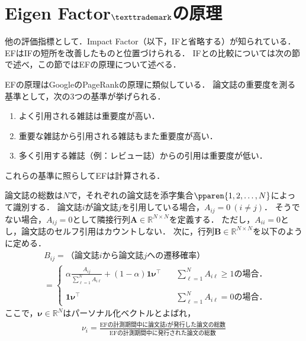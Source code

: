 
\section{Eigen Factor$\texttrademark$の原理}
他の評価指標として．Impact Factor（以下，IFと省略する）が知られている．
EFはIFの短所を改善したものと位置づけられる．
IFとの比較については次の節で述べ，この節ではEFの原理について述べる．
\par
EFの原理はGoogleのPageRankの原理に類似している．
論文誌の重要度を測る基準として，次の3つの基準が挙げられる．
\begin{enumerate}
    \item よく引用される雑誌は重要度が高い．
    \item 重要な雑誌から引用される雑誌もまた重要度が高い．
    \item 多く引用する雑誌（例：レビュー誌）からの引用は重要度が低い．
\end{enumerate}
これらの基準に照らしてEFは計算される．
\par
論文誌の総数は$N$で，それぞれの論文誌を添字集合$\pparen{1,2,\ldots,N}$によって識別する．
論文誌$i$が論文誌$j$を引用している場合，$A_{ij}=0~(i\neq j)$．
そうでない場合，$A_{ij}=0$として隣接行列$\bm{A} \in \mathbb{R}^{N \times N}$を定義する．
ただし，$A_{ii}=0$とし，論文誌のセルフ引用はカウントしない．
次に，行列$\bm{B} \in \mathbb{R}^{N \times N}$を以下のように定める．
\begin{align*}
     & B_{ij} = \text{（論文誌$i$から論文誌$j$への遷移確率）}                                                                                \\
     & =\begin{cases}
            \alpha \frac{A_{ij}}{\sum_{\ell=1}^N A_{i\ell}} + (1-\alpha) \bm{1}\bm{\nu}^{\top}
             & \quad \sum_{\ell=1}^N A_{i\ell} \geq 1\text{の場合．} \\
            \\
            \bm{1}\bm{\nu}^{\top}
             & \quad \sum_{\ell=1}^N A_{i\ell} =0\text{の場合．}
        \end{cases}
\end{align*}
ここで，$\bm{\nu} \in \mathbb{R}^N$はパーソナル化ベクトルとよばれ，
\begin{align*}
    \nu_i
    = \frac{\text{EFの計測期間中に論文誌$i$が発行した論文の総数}}{\text{EFの計測期間中に発行された論文の総数}}
\end{align*}
